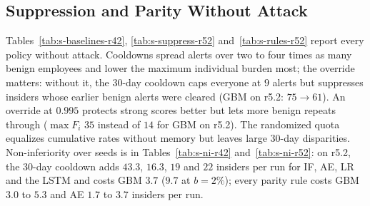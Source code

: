 \documentclass[10pt,onecolumn,letterpaper]{article}
\begin{document}
\subsection{Suppression and Parity Without Attack}
Tables~\ref{tab:s-baselines-r42}, \ref{tab:s-suppress-r52} and~\ref{tab:s-rules-r52} report every policy without attack. Cooldowns spread alerts over two to four times as many benign employees and lower the maximum individual burden most; the override matters: without it, the 30-day cooldown caps everyone at $9$ alerts but suppresses insiders whose earlier benign alerts were cleared (GBM on r5.2: $75\to61$). An override at $0.995$ protects strong scores better but lets more benign repeats through ($\max F_i$ $35$ instead of $14$ for GBM on r5.2). The randomized quota equalizes cumulative rates without memory but leaves large 30-day disparities. Non-inferiority over seeds is in Tables~\ref{tab:s-ni-r42} and~\ref{tab:s-ni-r52}: on r5.2, the 30-day cooldown adds $43.3$, $16.3$, $19$ and $22$ insiders per run for IF, AE, LR and the LSTM and costs GBM $3.7$ ($9.7$ at $b=2\%$); every parity rule costs GBM $3.0$ to $5.3$ and AE $1.7$ to $3.7$ insiders per run.
\end{document}
